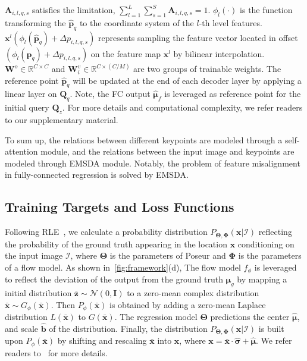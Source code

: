 \documentclass[runningheads]{llncs}
\def\handle{{Poseur}\xspace}
\def\R{{\mathbb R}}
\def\Loc{{\boldsymbol{\mu}}}
\def\loc{{\boldsymbol{\mu}}}
\def\b{{\boldsymbol{b}}}
\def\KPF{{\hat{\mathbf{\Loc}}_f}}
\def\Q{{\mathbf{Q}}}
\def\QZ{{\Q_z}}
\def\p{{\mathbf{p}}}
\def\x{{\mathbf{x}}}
\def\A{{\mathbf{A}}}
\def\W{{\mathbf{W}}}
\def\BTheta{{\boldsymbol{\Theta}}}
\def\BPhi{{\boldsymbol{\Phi}}}
\begin{document}
$\A_{i,l,q,s}$ satisfies the limitation, $\sum\limits_{l=1}^{L}{\sum\limits_{s=1}^{S}{\A_{i,l,q,s}}}=1$. $\phi_l(\cdot)$ is the function transforming the $\hat{\p}_q$ to the coordinate system of the $l$-th level features. $\x^l(\phi_l(\hat{\p}_q)+\Delta{p_{i,l,q,s}})$ represents sampling the feature vector located in offset $(\phi_l(\hat{\p}_q)+\Delta{p_{i,l,q,s}})$ on the feature map $\x^l$ by bilinear interpolation. $\W^o \in \R^{C \times C}$ and $\W^v_i \in \R^{C \times (C/M)}$ are two groups of trainable weights. The reference point $\hat{\p}_q$ will be updated at the end of each decoder layer by applying a linear layer on $\Q_q$. Note, the FC output $\KPF$ is leveraged as reference point for the initial query $\QZ$. For more details and computational complexity, we refer readers to our supplementary material. 




To sum up, the relations between different keypoints are modeled through a self-attention module, and the relations between the input image and keypoints are modeled through EMSDA module. Notably, the problem of feature misalignment in fully-connected regression is solved by EMSDA. 









\subsection{Training Targets and Loss Functions}\label{sec:loss}
Following RLE~\cite{li2021rle}, we calculate a probability distribution $P_{{\BTheta}, {\BPhi}}(\x | \mathcal{I})$ reflecting the probability of the ground truth appearing in the location $\x$ conditioning on the input image $\mathcal{I}$, where $\BTheta$ is the parameters of \handle and $\BPhi$ is the parameters of a flow model. As shown in~\cref{fig:framework}(d), The flow model $f_{\phi}$ is leveraged to reflect the deviation of the output from the ground truth $\loc_g$ by mapping a initial distribution $\bar{\textbf{z}} \sim \mathcal{N}(0, \mathbf{I})$ to a zero-mean complex distribution $\bar{\textbf{x}} \sim G_{\phi}(\bar{\textbf{x}})$. 
Then $P_{\phi}(\bar{\x})$ is obtained by adding a zero-mean Laplace distribution $L(\bar{\x})$ to $G(\bar{\x})$.
The regression model $\BTheta$ predictions the center $\hat{\loc}$, and scale $\hat{\b}$ of the distribution. Finally, the distribution $P_{{\BTheta}, {\BPhi}}(\x | \mathcal{I})$ is built upon $P_{\phi}(\bar{\x})$ by shifting and rescaling $\bar{\x}$ into $\x$, where $\x = \bar{\x} \cdot \hat{\boldsymbol{\sigma}} + \hat{\loc}$. We refer readers to~\cite{li2021rle} for
more details.
\end{document}
